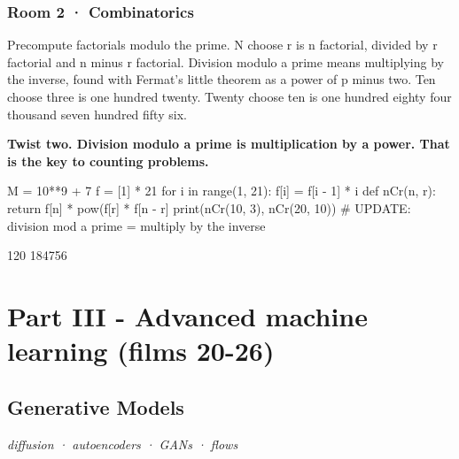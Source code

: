 \documentclass[11pt,a4paper]{report}
\begin{document}
\section*{Room 2 · Combinatorics}
Precompute factorials modulo the prime. N choose r is n factorial, divided by r factorial and n minus r factorial. Division modulo a prime means multiplying by the inverse, found with Fermat's little theorem as a power of p minus two. Ten choose three is one hundred twenty. Twenty choose ten is one hundred eighty four thousand seven hundred fifty six.
\begin{tcolorbox}[colback=yellow!12,colframe=orange!70!black,boxrule=0.4pt,left=4pt,right=4pt,top=2pt,bottom=2pt]\textbf{Twist two. Division modulo a prime is multiplication by a power. That is the key to counting problems.}\end{tcolorbox}
\begin{Code}
M = 10**9 + 7
f = [1] * 21
for i in range(1, 21): f[i] = f[i - 1] * i %
def nCr(n, r): return f[n] * pow(f[r] * f[n - r] %
print(nCr(10, 3), nCr(20, 10))
# UPDATE: division mod a prime = multiply by the inverse
\end{Code}
\begin{Out}
120 184756
\end{Out}
\part*{Part III - Advanced machine learning (films 20-26)}
\chapter{Generative Models}
\textit{diffusion · autoencoders · GANs · flows}
\end{document}
